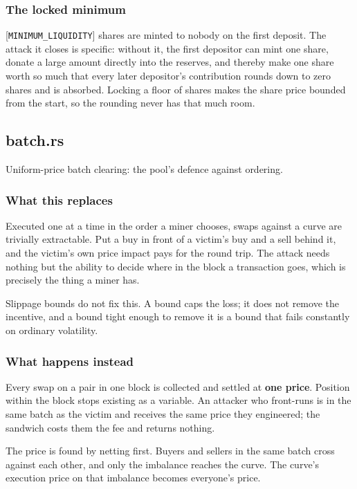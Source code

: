 \documentclass[11pt,a4paper]{article}
\begin{document}
\subsubsection{The locked minimum}

[\texttt{MINIMUM\_LIQUIDITY}] shares are minted to nobody on the first deposit. The
attack it closes is specific: without it, the first depositor can mint one
share, donate a large amount directly into the reserves, and thereby make
one share worth so much that every later depositor's contribution rounds
down to zero shares and is absorbed. Locking a floor of shares makes the
share price bounded from the start, so the rounding never has that much
room.

\subsection{batch.rs}
Uniform-price batch clearing: the pool's defence against ordering.

\subsubsection{What this replaces}

Executed one at a time in the order a miner chooses, swaps against a curve
are trivially extractable. Put a buy in front of a victim's buy and a sell
behind it, and the victim's own price impact pays for the round trip. The
attack needs nothing but the ability to decide where in the block a
transaction goes, which is precisely the thing a miner has.

Slippage bounds do not fix this. A bound caps the loss; it does not remove
the incentive, and a bound tight enough to remove it is a bound that fails
constantly on ordinary volatility.

\subsubsection{What happens instead}

Every swap on a pair in one block is collected and settled at \textbf{one price}.
Position within the block stops existing as a variable. An attacker who
front-runs is in the same batch as the victim and receives the same price
they engineered; the sandwich costs them the fee and returns nothing.

The price is found by netting first. Buyers and sellers in the same batch
cross against each other, and only the imbalance reaches the curve. The
curve's execution price on that imbalance becomes everyone's price.
\end{document}

